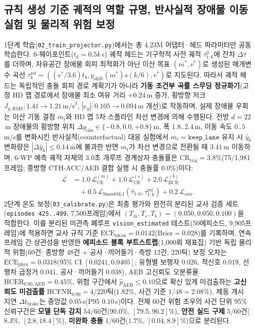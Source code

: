 \documentclass[10pt,twocolumn,a4paper]{article}
\begin{document}
\subsection{규칙 생성 기준 궤적의 역할 규명, 반사실적 장애물 이동 실험 및 물리적 위험 보정}
1단계 학습(\texttt{02\_train\_projector.py})에서는 총 4.23M 어댑터·헤드 파라미터만 공동 학습한다. 6-웨이포인트($t_k = 0.5k$\,s) 궤적 헤드는 기구학적 사전 궤적 $\tau^0_{1:6}$에 잔차 $\Delta\hat{\tau}$를 더하며, 자유공간 장애물 회피 최적화가 아닌 이산 목표 $(m^*, v^*)$로 생성된 매개변수 곡선 $\tau^{\text{ref}}_k = ((v^*/3.6)t_k, y_{\text{shift}}(m^*)s(k/6), v^*)$로 지도된다. 따라서 궤적 헤드는 독립적인 충돌 회피 경로 계획기가 아니라 \textbf{기동 조건부 곡률 스무딩 정규화기}(고정 HD 맵 경로에서 장애물 최소 여유 거리 $+0.24$\,m 증가, 횡방향 저크 $J_{y,\text{RMS}}: 1.41\to 1.21\,\text{m/s}^3$, $\overline{|e_y|}: 0.105\to 0.094$\,m 개선)로 작동하며, 실제 장애물 우회는 이산 기동 결정 $m_t$와 HD 맵 5차 스플라인 차선 변경에 의해 수행된다. 전방 $d=22$\,m 장애물의 횡방향 위치 $\Delta y_{\text{obs}} \in \{-0.8, 0.0, +0.8\}$\,m, 폭 $1.8..2.4$\,m, 이동 속도 $0..5$\,m/s를 변화시킨 반사실적(counterfactual) 대응 실험에서 $m_t=\texttt{keep\_lane}$ 유지 시 $\hat{y}_6$ 변화량은 $|\Delta\hat{y}_6|\le 0.14$\,m에 불과한 반면 $m_t$가 차선 변경으로 전환될 때 $3.41$\,m 이동하며, 6-WP 예측 궤적 자체의 3.0초 개루프 경계상자 충돌률은 $\text{CR}_{\text{traj}}=3.8\%$(75/1,981 프레임; 종방향 CTH-ACC/AEB 결합 실행 시 충돌률 $0.0\%$)이다:
\begin{align}
    \mathcal{L} &= 1.0\,\mathcal{L}_{\text{CE}}^{(m)} + 1.0\,\mathcal{L}_{\text{CE}}^{(s)} + 2.0\,\mathcal{L}_{\text{BCE}}^{(b)} \nonumber\\
                &\quad + 0.5\,\mathcal{L}_{\text{SmoothL1}}(\hat{\tau}_{1:6}, \tau^{\text{ref}}_{1:6}) + 0.2\,\mathcal{L}_{\text{aux}}.
\end{align}
2단계 온도 보정(\texttt{03\_calibrate.py})은 최종 평가와 완전히 분리된 교사 검증 세트(\texttt{episodes 425..499}, 7,500프레임)에서 $(T_m, T_s, T_b) = (0.050, 0.050, 0.100)$을 적합한다. 이를 분리된 미관측 폐루프 \texttt{vision\_estimated} 테스트(50에피소드, 9,905프레임)에 적용하면 교사 규칙 기준 $\text{ECE}_{\text{mean}}=0.0142$($\text{Brier}=0.028$)를 기록하며, 연속 프레임 간 상관성을 반영한 \textbf{에피소드 블록 부트스트랩}(1,000회 재표집) 기반 독립 물리적 위험(60건: 종방향 48건 + 공사·끼어들기·측방 12건; 220틱) 보정 오차는 $\text{ECE}_{\text{phys}}=0.0318$(95\% CI $[0.0241, 0.0405]$; 유형별 보행자 $0.026$, 적신호 $0.019$, 선행차 급정거 $0.041$, 공사·끼어들기 $0.038$), AEB 고신뢰도 오분류율 $\text{HCER}_{0.90,\text{AEB}}=0.45\%$, 위험 구간에서 $\hat{p}_{\text{AEB}}\le 0.10$으로 확신 있게 미검출하는 \textbf{고신뢰도 미검출률} $\text{HCFNR}_{0.90}=4/220$틱($1.82\%$, 사건 기준 $1/48=2.08\%$), 제동 개시 지연 $\Delta t_{\text{brake}}$는 중앙값 $0.05$\,s(P95 $0.10$\,s)이다. 전체 60건 위험 조우의 사건 단위 95\% 신뢰구간은 \textbf{모델 단독 감지} $54/60$건($90.0\%$, $[79.5, 96.2]\%$), \textbf{안전 실드 구제} $5/60$건($8.3\%$, $[2.8, 18.4]\%$), \textbf{미완화 충돌} $1/60$건($1.7\%$, $[0.04, 8.9]\%$)으로 분리된다.
\end{document}
